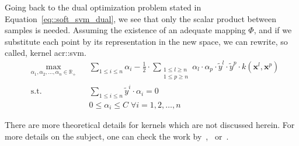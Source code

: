                 Going back to the dual optimization problem stated in Equation~\ref{eq::soft_svm_dual}, we see that only the scalar product between samples is needed.
                Assuming the existence of an adequate mapping $\Phi$, and if we substitute each point by its representation in the new space, we can rewrite, so called, kernel \gls{acr::svm}.
                \begin{equation}
                    \label{eq::kernel_soft_svm_dual}
                    \begin{aligned}
                        & \max_{\alpha_1, \alpha_2, \dots, \alpha_n \in \mathbb{R}_+}
                        & & \sum_{1 \leq i \leq n} \alpha_i - \frac{1}{2}\cdot\sum_{\substack{1\leq l \geq n\\1\leq p \geq n}}\alpha_l\cdot\alpha_p\cdot\tilde{y}^l\cdot\tilde{y}^p\cdot k(\bm{x}^l, \bm{x}^p)\\
                        &\text{s.t.} & & \sum_{1 \leq i \leq n}\tilde{y}^i\cdot\alpha_i=0 \\
                        & & & 0 \leq \alpha_i \leq C \; \forall i=1,2,\dots,n
                        \end{aligned}
                \end{equation}

                There are more theoretical details for kernels which are not discussed herein.
                For more details on the subject, one can check the work by~\textcite{aronszajn1950theory},~\textcite{vapnik2013nature} or~\textcite{shawe2004kernel}.

